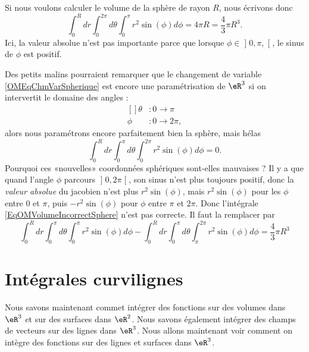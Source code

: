 Si nous voulons calculer le volume de la sphère de rayon $R$, nous écrivons donc
\begin{equation}
	\int_0^Rdr\int_{0}^{2\pi}d\theta\int_0^{\pi}r^2 \sin(\phi)d\phi=4\pi R=\frac{ 4 }{ 3 }\pi R^3.
\end{equation}
Ici, la valeur absolue n'est pas importante parce que lorsque $\phi\in\mathopen] 0,\pi ,  \mathclose[$, le sinus de $\phi$ est positif.

Des petits malins pourraient remarquer que le changement de variable \eqref{OMEqChmVarSpherique} est encore une paramétrisation de $\eR^3$ si on intervertit le domaine des angles : 
\begin{equation}
	\begin{aligned}[]
		\theta&\colon 0 \to \pi\\
		\phi	&\colon 0\to 2\pi,
	\end{aligned}
\end{equation}
alors nous paramétrons encore parfaitement bien la sphère, mais hélas
\begin{equation}		\label{EqOMVolumeIncorrectSphere}
	\int_0^Rdr\int_{0}^{\pi}d\theta\int_0^{2\pi}r^2 \sin(\phi)d\phi=0.
\end{equation}
Pourquoi ces «nouvelles» coordonnées sphériques sont-elles mauvaises ? Il y a que quand l'angle $\phi$ parcours $\mathopen] 0 , 2\pi \mathclose[$, son sinus n'est plus toujours positif, donc la \emph{valeur absolue} du jacobien n'est plus $r^2\sin(\phi)$, mais $r^2\sin(\phi)$ pour les $\phi$ entre $0$ et $\pi$, puis $-r^2\sin(\phi)$ pour $\phi$ entre $\pi$ et $2\pi$. Donc l'intégrale \eqref{EqOMVolumeIncorrectSphere} n'est pas correcte. Il faut la remplacer par
\begin{equation}
	\int_0^Rdr\int_{0}^{\pi}d\theta\int_0^{\pi}r^2 \sin(\phi)d\phi- \int_0^Rdr\int_{0}^{\pi}d\theta\int_{\pi}^{2\pi}r^2 \sin(\phi)d\phi = \frac{ 4 }{ 3 }\pi R^3
\end{equation}

\section{Intégrales curvilignes}

Nous savons maintenant commet intégrer des fonctions sur des volumes dans $\eR^3$ et sur des surfaces dans $\eR^2$. Nous savons également intégrer des champs de vecteurs sur des lignes dans $\eR^3$. Nous allons maintenant voir comment on intègre des fonctions sur des lignes et surfaces dans $\eR^3$.

